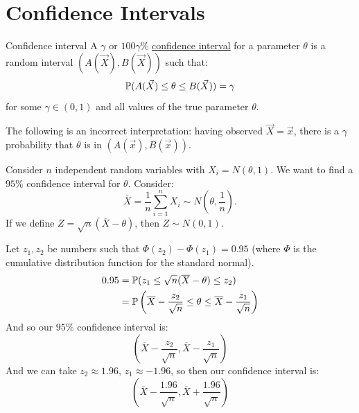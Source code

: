 \documentclass[../Main.tex]{subfiles}
\begin{document}
\section{Confidence Intervals}
\begin{definition}{Confidence interval}
    A $\gamma$ or $100\gamma\%$ \underline{confidence interval} for a parameter $\theta$ is a random interval $(A(\vec{X}), B(\vec{X}))$ such that:
    \begin{equation*}
        \P(A(\vec{X}) \leq \theta \leq B(\vec{X})) = \gamma
    \end{equation*}
    for some $\gamma \in (0, 1)$ and all values of the true parameter $\theta$.
\end{definition}
\begin{warning}
    The following is an incorrect interpretation: having observed $\vec{X} = \vec{x}$, there is a $\gamma$ probability that $\theta$ is in $(A(\vec{x}), B(\vec{x}))$.
\end{warning}
\begin{example}
    Consider $n$ independent random variables with $X_i = N(\theta, 1)$.
    We want to find a $95\%$ confidence interval for $\theta$. Consider:
    \begin{equation*}
        \overline{X} = \frac1n \sum_{i=1}^{n} X_i \sim N\left(\theta, \frac1n\right).
    \end{equation*}
    If we define $Z = \sqrt{n} \left(\overline{X} - \theta\right)$, then $Z \sim N(0, 1)$.

    Let $z_1, z_2$ be numbers such that $\Phi(z_2) - \Phi(z_1) = 0.95$ (where $\Phi$ is the cumulative distribution function for the standard normal).
    \begin{align*}
        0.95 &= \P(z_1 \leq \sqrt{n} (\overline{X} - \theta) \leq z_2) \\
        &= \P\left(\overline{X} - \frac{z_2}{\sqrt{n}} \leq \theta \leq \overline{X} - \frac{z_1}{\sqrt{n}}\right)
    \end{align*}
    And so our $95\%$ confidence interval is:
    \begin{equation*}
        \left(\overline{X} - \frac{z_2}{\sqrt{n}}, \overline{X} - \frac{z_1}{\sqrt{n}}\right)
    \end{equation*}
    And we can take $z_2 \approx 1.96$, $z_1 \approx -1.96$, so then our confidence interval is:
    \begin{equation*}
        \left(\overline{X} - \frac{1.96}{\sqrt{n}}, \overline{X} + \frac{1.96}{\sqrt{n}}\right)
    \end{equation*}
\end{example}
\end{document}
